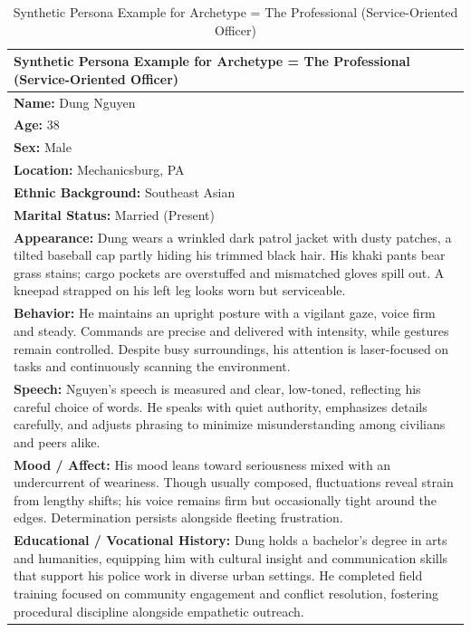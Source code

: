 \documentclass[11pt]{article}
\begin{document}
\begin{table}[ht]
\centering
\caption{Synthetic Persona Example for Archetype = The Professional (Service-Oriented Officer)}
\label{tab:persona-example-3}
\scriptsize
\begin{tabularx}{\textwidth}{@{}X@{}}
\toprule
\textbf{Synthetic Persona Example for Archetype = The Professional (Service-Oriented Officer)} \\
\midrule

\textbf{Name:} Dung Nguyen \\
\textbf{Age:} 38 \\
\textbf{Sex:} Male \\
\textbf{Location:} Mechanicsburg, PA \\
\textbf{Ethnic Background:} Southeast Asian \\
\textbf{Marital Status:} Married (Present) \\[4pt]

\textbf{Appearance:} Dung wears a wrinkled dark patrol jacket with dusty patches, a tilted baseball cap partly hiding his trimmed black hair. His khaki pants bear grass stains; cargo pockets are overstuffed and mismatched gloves spill out. A kneepad strapped on his left leg looks worn but serviceable. \\[4pt]

\textbf{Behavior:} He maintains an upright posture with a vigilant gaze, voice firm and steady. Commands are precise and delivered with intensity, while gestures remain controlled. Despite busy surroundings, his attention is laser-focused on tasks and continuously scanning the environment. \\[4pt]

\textbf{Speech:} Nguyen’s speech is measured and clear, low-toned, reflecting his careful choice of words. He speaks with quiet authority, emphasizes details carefully, and adjusts phrasing to minimize misunderstanding among civilians and peers alike. \\[4pt]

\textbf{Mood / Affect:} His mood leans toward seriousness mixed with an undercurrent of weariness. Though usually composed, fluctuations reveal strain from lengthy shifts; his voice remains firm but occasionally tight around the edges. Determination persists alongside fleeting frustration. \\[4pt]

\textbf{Educational / Vocational History:} Dung holds a bachelor’s degree in arts and humanities, equipping him with cultural insight and communication skills that support his police work in diverse urban settings. He completed field training focused on community engagement and conflict resolution, fostering procedural discipline alongside empathetic outreach. \\[4pt]


\end{tabularx}
\end{table}
\end{document}
